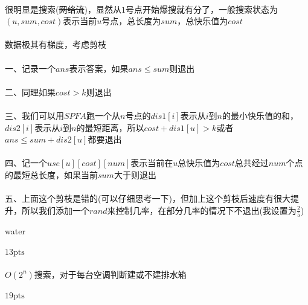 \documentclass[UTF8]{ctexart}
\begin{document}
\paragraph{}很明显是搜索(\sout{网络流})，显然从$1$号点开始爆搜就有分了，一般搜索状态为$(u,sum,cost)$表示当前$u$号点，总长度为$sum$，总快乐值为$cost$
\paragraph{}数据极其有梯度，考虑剪枝
\paragraph{}一、记录一个$ans$表示答案，如果$ans\leq sum$则退出
\paragraph{}二、同理如果$cost>k$则退出
\paragraph{}三、我们可以用$SPFA$跑一个从$n$号点的$dis1[i]$表示从$i$到$n$的最小快乐值的和，$dis2[i]$表示从$i$到$n$的最短距离，所以$cost+dis1[u]>k$或者$ans\leq sum+dis2[u]$都要退出
\paragraph{}四、记一个$use[u][cost][num]$表示当前在$u$总快乐值为$cost$总共经过$num$个点的最短总长度，如果当前$sum$大于则退出
\paragraph{}五、上面这个剪枝是错的(可以仔细思考一下)，但加上这个剪枝后速度有很大提升，所以我们添加一个$rand$来控制几率，在部分几率的情况下不退出(我设置为$\frac{2}{5}$)

\clearpage

\begin{center}
    \large{water}
\end{center}
\paragraph{$13\mathrm{pts}$}
\paragraph{}$O(2^n)$搜索，对于每台空调判断建或不建排水箱
\paragraph{$19\mathrm{pts}$}
\end{document}
